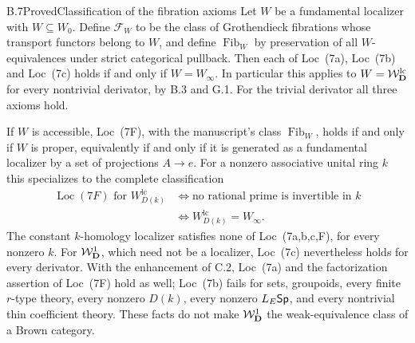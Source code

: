 \begin{claim}{B.7}{Proved}{Classification of the fibration axioms}
Let $W$ be a fundamental localizer with
$W\subseteq W_0$. Define $\mathcal F_W$ to be the class
of Grothendieck fibrations whose transport functors belong
to $W$, and define $\operatorname{Fib}_W$ by preservation
of all $W$-equivalences under strict categorical pullback.
Then each of Loc~(7a), Loc~(7b) and Loc~(7c) holds if and
only if $W=W_\infty$. In particular this applies to
$W=\mathcal W_{\mathbf D}^{\mathrm{lc}}$ for every nontrivial derivator, by B.3 and G.1.
For the trivial derivator all three axioms hold.

If $W$ is accessible, Loc~(7F), with the manuscript's
class $\operatorname{Fib}_W$, holds if and only if $W$
is proper, equivalently if and only if it is generated
as a fundamental localizer by a set of projections
$A\to e$. For a nonzero associative unital ring $k$ this
specializes to the complete classification
\[
\begin{split}
 \operatorname{Loc}(7F)\text{ for }W_{D(k)}^{\mathrm{lc}}
 &\Longleftrightarrow
  \text{no rational prime is invertible in }k\\
 &\Longleftrightarrow W_{D(k)}^{\mathrm{lc}}=W_\infty.
\end{split}
\tag{B.7.1}
\]
The constant $k$-homology localizer satisfies none of
Loc~(7a,b,c,F), for every nonzero $k$.
For $\mathcal W_{\mathbf D}^{1}$, which need not be a localizer,
Loc~(7c) nevertheless holds for every derivator.
With the enhancement of C.2, Loc~(7a) and the
factorization assertion of Loc~(7F) hold as well;
Loc~(7b) fails for sets, groupoids, every finite
$r$-type theory, every nonzero $D(k)$, every nonzero
$L_E\mathsf{Sp}$, and every nontrivial thin coefficient
theory. These facts do not make $\mathcal W_{\mathbf D}^{1}$ the
weak-equivalence class of a Brown category.
\end{claim}
